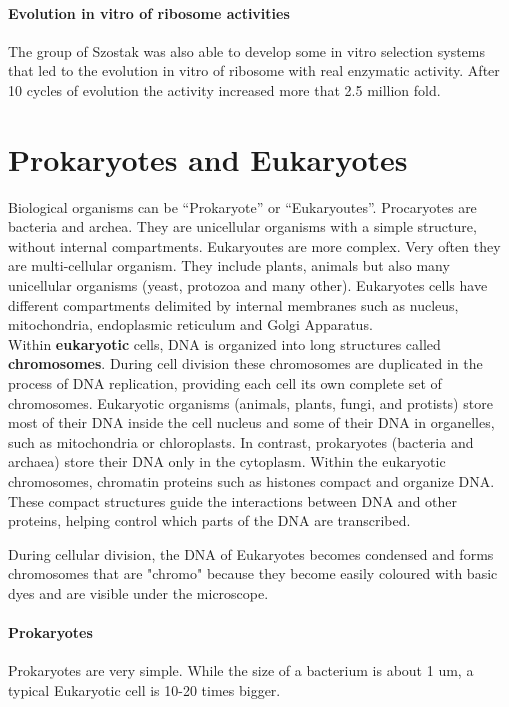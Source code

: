 \paragraph*{Evolution in vitro of ribosome activities}
The group of Szostak was also able to develop some in vitro selection systems
that led to the evolution in vitro of ribosome with real enzymatic activity.
After 10 cycles of evolution the activity increased more that 2.5 million fold.

\section{Prokaryotes and Eukaryotes}

Biological organisms can be ``Prokaryote'' or ``Eukaryoutes''. Procaryotes are
bacteria and archea. They are unicellular organisms with a simple structure,
without internal compartments. Eukaryoutes are more complex. Very often they are
multi-cellular organism. They include plants, animals but also many unicellular
organisms (yeast, protozoa and many other). Eukaryotes cells have different
compartments delimited by internal membranes such as nucleus, mitochondria,
endoplasmic reticulum and Golgi Apparatus.\\

Within \textbf{eukaryotic} cells, DNA is organized into long structures called 
\textbf{chromosomes}. 
During cell division these chromosomes are duplicated in the process of DNA 
replication, providing each cell its own complete set of chromosomes. 
Eukaryotic organisms (animals, plants, fungi, and protists) store most of 
their DNA inside the cell nucleus and some of their DNA in organelles, such as 
mitochondria or chloroplasts.
In contrast, prokaryotes (bacteria and archaea) store their DNA only in the 
cytoplasm. 
Within the eukaryotic chromosomes, chromatin proteins such as histones compact 
and organize DNA. 
These compact structures guide the interactions between DNA and other proteins, 
helping control which parts of the DNA are transcribed.

During cellular division, the DNA
of Eukaryotes becomes condensed and forms chromosomes that are "chromo" because
they become easily coloured with basic dyes and are visible under the
microscope.

\paragraph*{Prokaryotes} Prokaryotes are very simple. While the size of a
bacterium is about 1 um, a typical Eukaryotic cell is 10-20 times bigger.

